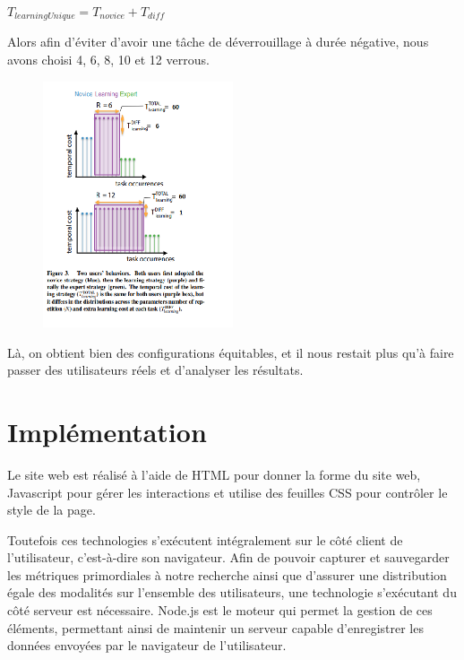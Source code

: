 \documentclass[a4paper, 12pt]{report}
\begin{document}
        $T_{learningUnique} = T_{novice} + T_{diff}$
        
        Alors afin d'éviter d'avoir une tâche de déverrouillage à durée négative, nous avons choisi 4, 6, 8, 10 et 12 verrous.
        
        \begin{figure}[H]
            \centering
            \includegraphics[width=0.5\textwidth]{img/fig1.png}
        \end{figure}
       
        Là, on obtient bien des configurations équitables, et il nous restait plus qu'à 
        faire passer des utilisateurs réels et d'analyser les résultats.
    
        \section{Implémentation}
        Le site web est réalisé à l'aide de HTML pour donner la forme du site web,
        Javascript pour gérer les interactions et utilise des feuilles CSS pour contrôler le style de la page.
        
        
        Toutefois ces technologies s'exécutent intégralement sur le côté client de l'utilisateur, c'est-à-dire 
        son navigateur. Afin de pouvoir capturer et sauvegarder les métriques primordiales à notre recherche
        ainsi que d'assurer une distribution égale des modalités sur l'ensemble des utilisateurs,
        une technologie s'exécutant du côté serveur est nécessaire.
        Node.js est le moteur qui permet la gestion de ces éléments, permettant ainsi de maintenir un serveur
        capable d'enregistrer les données envoyées par le navigateur de l'utilisateur.
        
\end{document}
